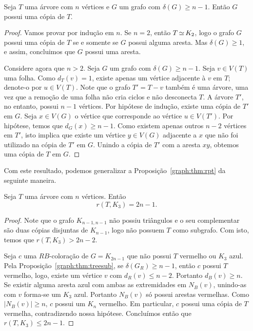 \begin{proposition}
\label{graph:thm:treesub}
Seja $T$ uma árvore com $n$ vértices e $G$ um grafo com $\delta(G) \geq n-1$. Então $G$ possui uma cópia de $T$.
\end{proposition}
\begin{proof}
Vamos provar por indução em $n$. Se $n = 2$, então $T \operatorname{\simeq} K_2$, logo o grafo $G$ possui uma cópia de $T$ se e somente se $G$ possui alguma aresta. Mas $\delta(G) \geq 1$, e assim, concluimos que $G$ possui uma aresta.

Considere agora que $n > 2$. Seja $G$ um grafo com $\delta(G) \geq n-1$. Seja $v \in V(T)$ uma folha. Como $d_T(v) =1$, existe apenas um vértice adjacente à $v$ em $T$; denote-o por $u \in V(T)$. Note que o grafo $T' = T - v$ também é uma árvore, uma vez que a remoção de uma folha não cria ciclos e não desconecta $T$. A árvore $T'$, no entanto, possui $n-1$ vértices. Por hipótese de indução, existe uma cópia de $T'$ em $G$. Seja $x \in V(G)$ o vértice que corresponde ao vértice $u \in V(T')$.
Por hipótese, temos que $d_G(x) \geq n-1$. Como existem apenas outros $n-2$ vértices em $T'$, isto implica que existe um vértice $y \in V(G)$ adjacente a $x$ que não foi utilizado na cópia de $T'$ em $G$. Unindo a cópia de $T'$ com a aresta $xy$, obtemos uma cópia de $T$ em $G$.
\end{proof}

Com este resultado, podemos generalizar a Proposição~\ref{graph:thm:rpt} da seguinte maneira.

\begin{proposition}
\label{graph:thm:ramseytree}
Seja $T$ uma árvore com $n$ vértices. Então
\[r(T,K_3) = 2n - 1.\]
\end{proposition}
\begin{proof}
Note que o grafo $K_{n-1,n-1}$ não possiu triângulos e o seu complementar são duas cópias disjuntas de $K_{n-1}$, logo não possuem $T$ como subgrafo. Com isto, temos que $r(T,K_3) > 2n - 2$.

Seja $c$ uma $RB$-coloração de $G = K_{2n-1}$ que não possui $T$ vermelho ou $K_3$ azul. Pela Proposição~\ref{graph:thm:treesub}, se $\delta(G_R) \geq n-1$, então $c$ possui $T$ vermelho, logo, existe um vértice $v$ com $d_R(v) \leq n - 2$. Portanto $d_B(v) \geq n$. Se existir alguma aresta azul com ambas as extremidades em $N_B(v)$, unindo-as com $v$ forma-se um $K_3$ azul.
Portanto $N_B(v)$ só possui arestas vermelhas. Como $|N_B(v)| \geq n$, $c$ possui um $K_n$ vermelho. Em particular, $c$ possui uma cópia de $T$ vermelha, contradizendo nossa hipótese. Concluímos então que $r(T,K_3) \leq 2n - 1$.
\end{proof}

